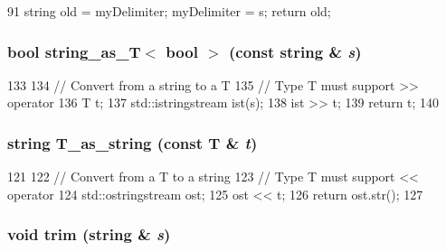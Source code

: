 \begin{DoxyCode}
91                 { string old = myDelimiter;  myDelimiter = s;  return old; }  
\end{DoxyCode}
\hypertarget{classConfigFile_a6bfbf02be3870556c253a58b9e3b0700}{
\subsubsection[{string\_\-as\_\-T}]{\setlength{\rightskip}{0pt plus 5cm}bool string\_\-as\_\-T$<$ bool $>$ (const string \& {\em s})}}
\label{classConfigFile_a6bfbf02be3870556c253a58b9e3b0700}



\begin{DoxyCode}
133 {
134         // Convert from a string to a T
135         // Type T must support >> operator
136         T t;
137         std::istringstream ist(s);
138         ist >> t;
139         return t;
140 }
\end{DoxyCode}
\hypertarget{classConfigFile_a149d917011dbfb103a47c5a7cf3a446f}{
\subsubsection[{T\_\-as\_\-string}]{\setlength{\rightskip}{0pt plus 5cm}string T\_\-as\_\-string (const T \& {\em t})}}
\label{classConfigFile_a149d917011dbfb103a47c5a7cf3a446f}



\begin{DoxyCode}
121 {
122         // Convert from a T to a string
123         // Type T must support << operator
124         std::ostringstream ost;
125         ost << t;
126         return ost.str();
127 }
\end{DoxyCode}
\hypertarget{classConfigFile_a8bddc3dcbfa8ff455abebaf144a1f5cf}{
\subsubsection[{trim}]{\setlength{\rightskip}{0pt plus 5cm}void trim (string \& {\em s})}}
\label{classConfigFile_a8bddc3dcbfa8ff455abebaf144a1f5cf}



